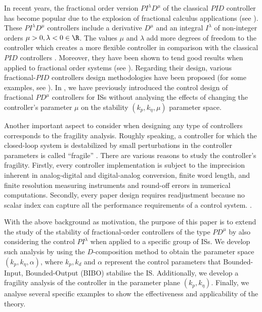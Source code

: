 \documentclass[twoside,reqno,11pt]{fcaa-var} %
\begin{document}
In recent years, the fractional order version $PI^\lambda D^\mu$ of the classical $PID$ controller has become popular due to the explosion of fractional calculus applications (see \cite{Shah2016,Tepljakov2013,Guel-Cortez2018,Guel-Cortez2019}). These $PI^\lambda D^\mu$ controllers include a derivative $D^\mu$ and an integral $I^\lambda$ of non-integer orders $\mu>0,\lambda<0\in\R$. The values $\mu$ and $\lambda$ add more degrees of freedom to the controller which creates a more flexible controller in comparison with the classical $PID$ controllers \cite{valerio2013anintroduction}. Moreover, they have been shown to tend good results when applied to fractional order systems (see \cite{Caponetto2010,Monje2010,Tavazoei2012,Guel-Cortez2018,Guel-Cortez2019}). Regarding their design, various fractional-$PID$ controllers design methodologies have been proposed (for some examples, see \cite{Guel-Cortez2018,Guel-Cortez2019,Petras2019,GHORBANI20199302,Gao2019,Birs2019}). In \cite{Guel-Cortez2019a}, we have previously introduced the control design of fractional $PD^\mu$ controllers for ISs without analysing the effects of changing the controller's parameter $\mu$ on the stability $(k_p,k_\eta,\mu)$ parameter space. \par
Another important aspect to consider when designing any type of controllers corresponds to the fragility analysis. Roughly speaking, a controller for which the closed-loop system is destabilized by small perturbations in the controller parameters is called “fragile” \cite{mendez2008fragility}. There are various reasons to study the controller's fragility. Firstly, every controller implementation is subject to the imprecision inherent in analog-digital and digital-analog conversion, finite word length, and finite resolution measuring instruments and round-off errors in numerical computations. Secondly, every paper design requires readjustment because no scalar index can capture all the performance requirements of a control system. \cite{keel1997robust,alfaro2007pid,ho2000non}.\par 
With the above background as motivation, the purpose of this paper is to extend the study of the stability of fractional-order controllers of the type $PD^\mu$ by also considering the control $PI^\lambda$ when applied to a specific group of ISs. We develop such analysis by using the $D$-composition method \cite{gryazina2008d,gryazina2004d} to obtain the parameter space $(k_p,k_\eta,\alpha)$, where $k_p,k_d$ and $\alpha$ represent the control parameters that Bounded-Input, Bounded-Output (BIBO) stabilise the IS. Additionally, we develop a fragility analysis of the controller in the parameter plane $(k_p,k_\eta)$. Finally, we analyse several specific examples to show the effectiveness and applicability of the theory.\par 
\end{document}

